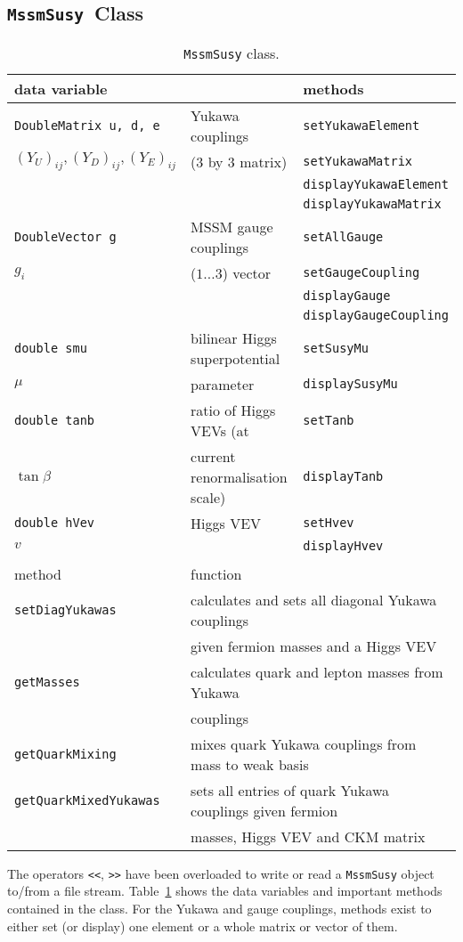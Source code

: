 \documentclass[]{article}
\def\code#1{\small{\tt #1}\normalsize}
\begin{document}
\subsection{\code{MssmSusy}~Class \label{sec:mssmsusy}}
%
\begin{table}\begin{center}\begin{tabular}{lll} 
data variable & & methods \\ \hline
\code{DoubleMatrix u, d, e}  & Yukawa
couplings & \code{setYukawaElement} \\ 
$(Y_U)_{ij}, (Y_D)_{ij}, (Y_E)_{ij}$&(3 by 3 matrix) &
\code{setYukawaMatrix} \\
 & & \code{displayYukawaElement}\\
 & & \code{displayYukawaMatrix}\\ \hline
\code{DoubleVector g} & MSSM gauge couplings & \code{setAllGauge} \\
$g_i$ & ($1 \ldots 3$) vector & \code{setGaugeCoupling} \\ 
 & & \code{displayGauge} \\
 & & \code{displayGaugeCoupling} \\ \hline
\code{double smu} & bilinear Higgs superpotential & \code{setSusyMu}\\
$\mu$ & parameter & \code{displaySusyMu}\\ \hline
\code{double tanb} & ratio of Higgs VEVs (at  & \code{setTanb}\\
  $\tan \beta$  &  current renormalisation scale)& \code{displayTanb} \\ \hline
\code{double hVev} & Higgs VEV & \code{setHvev} \\
$v$ & & \code{displayHvev} \\
 & & \\
method & \multicolumn{2}{l}{function} \\ \hline 
\code{setDiagYukawas} & \multicolumn{2}{l}{calculates and sets all diagonal
Yukawa couplings }\\
& \multicolumn{2}{l}{given fermion masses and a Higgs VEV} \\
\code{getMasses} & \multicolumn{2}{l}{calculates quark and lepton masses from
Yukawa} \\
 &  \multicolumn{2}{l}{couplings}\\
\code{getQuarkMixing} & \multicolumn{2}{l}{mixes quark Yukawa couplings from mass to weak basis}\\
\code{getQuarkMixedYukawas} & \multicolumn{2}{l}{sets all entries of quark Yukawa couplings given
fermion} \\
 & \multicolumn{2}{l}{masses, Higgs VEV and CKM matrix }\\
\end{tabular}
\caption{\label{tab:mssmsusy}\code{MssmSusy} class. }\end{center}\end{table}
%
The operators \code{<<}, \code{>>} have been overloaded to write or read a
\code{MssmSusy} object to/from a file stream. Table~\ref{tab:mssmsusy} shows
the data variables and important methods contained in the class. For the
Yukawa and gauge couplings, methods exist to either set (or display) one
element or a whole matrix or vector of them.
\end{document}
